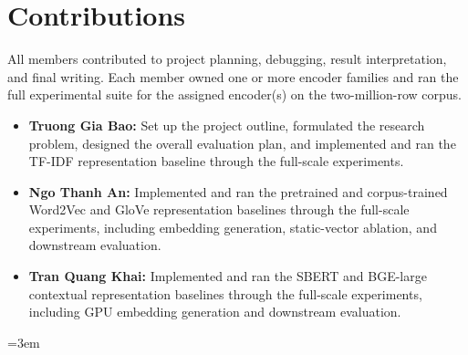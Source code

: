 \documentclass{article}
\begin{document}
\section*{Contributions}

All members contributed to project planning, debugging, result interpretation, and final writing. Each member owned one or more encoder families and ran the full experimental suite for the assigned encoder(s) on the two-million-row corpus.

\begin{itemize}
    \item \textbf{Truong Gia Bao:} Set up the project outline, formulated the research problem, designed the overall evaluation plan, and implemented and ran the TF-IDF representation baseline through the full-scale experiments.
    \item \textbf{Ngo Thanh An:} Implemented and ran the pretrained and corpus-trained Word2Vec and GloVe representation baselines through the full-scale experiments, including embedding generation, static-vector ablation, and downstream evaluation.
    \item \textbf{Tran Quang Khai:} Implemented and ran the SBERT and BGE-large contextual representation baselines through the full-scale experiments, including GPU embedding generation and downstream evaluation.
\end{itemize}

\newpage

\begingroup
\sloppy
\emergencystretch=3em


\endgroup
\end{document}

